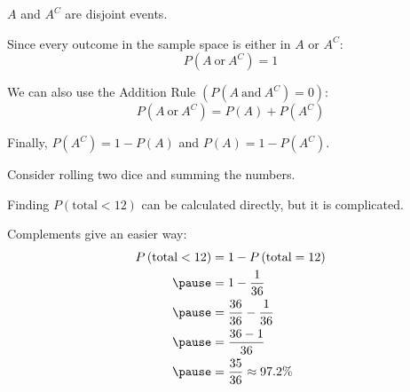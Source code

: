 \documentclass{beamer}
\newcommand{\prob}[1]{P\left(#1\right)}
\begin{document}
\begin{frame}
\begin{note}
$A$ and $A^C$ are disjoint events.
\end{note}\pause

\begin{note}
Since every outcome in the sample space is either in $A$ or $A^C$:
\begin{equation*}
\prob{A~\text{or}~A^C} = 1
\end{equation*}
\end{note}\pause

\begin{note}
We can also use the Addition Rule $\left(\prob{A~\text{and}~A^C} = 0\right)$:
\begin{equation*}
\prob{A~\text{or}~A^C} = \prob{A} + \prob{A^C}
\end{equation*}
\end{note}\pause

\begin{note}
Finally, $\prob{A^C} = 1 - \prob{A}$ and $\prob{A} = 1 - \prob{A^C}$.
\end{note}
\end{frame}

\begin{frame}
\begin{example}
Consider rolling two dice and summing the numbers.

\vspace{2mm}
\pause
{}\pause

\vspace{2mm}
Finding $\prob{\text{total} < 12}$ can be calculated directly, but it is complicated.\pause

\vspace{1mm}
Complements give an easier way:
\begin{equation*}
\begin{aligned}
\prob{\text{total} < 12} &= 1 - \prob{\text{total} = 12} \\\pause
&= 1 - \dfrac{1}{36} \\\pause
&= \dfrac{36}{36} - \dfrac{1}{36} \\\pause
&= \dfrac{36-1}{36} \\\pause
&= \dfrac{35}{36} \approx{97.2\%}
\end{aligned}
\end{equation*}
\end{example}
\end{frame}
\end{document}

